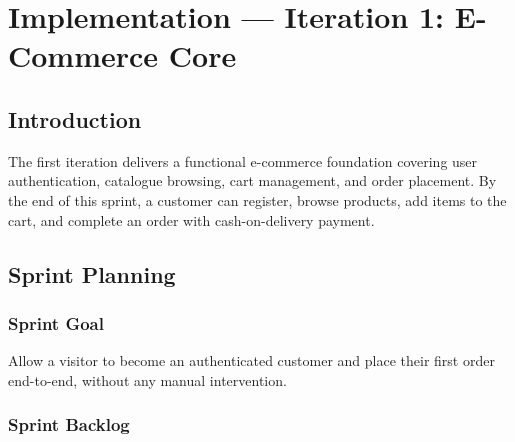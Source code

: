 \chapter{Implementation --- Iteration 1: E-Commerce Core}

\section*{Introduction}
The first iteration delivers a functional e-commerce foundation covering user
authentication, catalogue browsing, cart management, and order placement.
By the end of this sprint, a customer can register, browse products,
add items to the cart, and complete an order with cash-on-delivery payment.

\section{Sprint Planning}

\subsection{Sprint Goal}

\begin{tcolorbox}[colback=blue!5, colframe=blue!40, title=Sprint Goal --- Iteration 1]
Allow a visitor to become an authenticated customer and place their first
order end-to-end, without any manual intervention.
\end{tcolorbox}

\subsection{Sprint Backlog}

